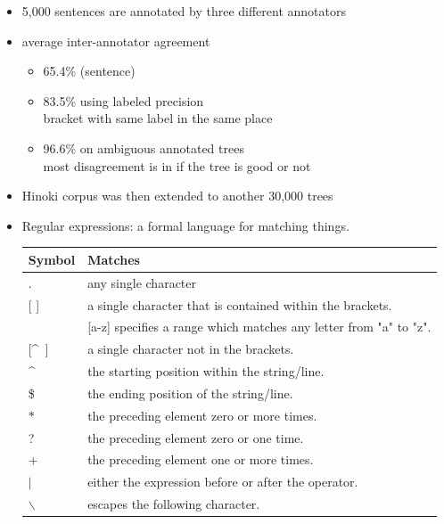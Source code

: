 \documentclass[a4paper,landscape,headrule,footrule,dvips]{foils}
\begin{document}
\begin{CJK}{UTF8}{min}
\begin{itemize}
\item  5,000 sentences are annotated by three different annotators
\item  average inter-annotator agreement
  \begin{itemize}
  \item 65.4\% (sentence)
  \item 83.5\% using labeled precision
    \\ bracket with same label in the same place
  \item 96.6\% on ambiguous annotated trees 
    \\ most disagreement is in if the tree is good or not
  \end{itemize}
\item Hinoki corpus was then extended to another 30,000 trees
\end{itemize}





\begin{itemize}
\item Regular expressions: a formal language for matching things.
\\[2ex]
  \begin{tabular}{ll}
    Symbol & Matches \\ \hline
    . & any single character\\
    {[ ]} & a single character that is contained within the brackets. \\
    & {[a-z]} specifies a range which matches any  letter from "a" to "z".\\
    {[\textasciicircum ~]} & 	a single character not in the brackets. \\
    \textasciicircum 	& the starting position within the string/line. \\
    \$ 	&  the ending position of the string/line. \\
    $*$ &	the preceding element zero or more times. \\
    ? &	 the preceding element zero or one time. \\
    + &	 the preceding element one or more times. \\
    $|$ &  either the expression before or after the operator. \\
    $\backslash$ & escapes the following character. \\
  \end{tabular}


\end{itemize}
\end{CJK}
\end{document}
